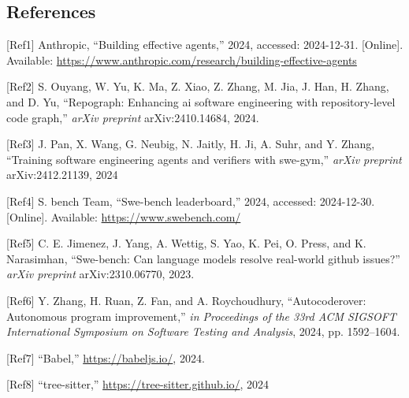 \documentclass[12pt,american]{article}
\begin{document}
\begin{revresponse}

\section*{References}
\begin{flushleft}
\small
    [Ref1] Anthropic, “Building effective agents,” 2024, accessed: 2024-12-31. [Online]. Available: \url{https://www.anthropic.com/research/building-effective-agents}
    
    [Ref2] S. Ouyang, W. Yu, K. Ma, Z. Xiao, Z. Zhang, M. Jia, J. Han, H. Zhang, and D. Yu, “Repograph: Enhancing ai software
    engineering with repository-level code graph,” \textit{arXiv preprint} arXiv:2410.14684, 2024.
    
    [Ref3] J. Pan, X. Wang, G. Neubig, N. Jaitly, H. Ji, A. Suhr, and Y. Zhang, “Training software engineering agents and verifiers
    with swe-gym,” \textit{arXiv preprint} arXiv:2412.21139, 2024
    
  [Ref4] S. bench Team, “Swe-bench leaderboard,” 2024, accessed: 2024-12-30. [Online]. Available: \url{https://www.swebench.com/}

   [Ref5] C. E. Jimenez, J. Yang, A. Wettig, S. Yao, K. Pei, O. Press, and K. Narasimhan, “Swe-bench: Can language models resolve real-world github issues?” \textit{arXiv preprint} arXiv:2310.06770, 2023.

   [Ref6] Y. Zhang, H. Ruan, Z. Fan, and A. Roychoudhury, “Autocoderover: Autonomous program improvement,” \textit{in Proceedings of the 33rd ACM SIGSOFT International Symposium on Software Testing and Analysis}, 2024, pp. 1592–1604.

   [Ref7] “Babel,” \url{https://babeljs.io/}, 2024.

    [Ref8] “tree-sitter,” \url{https://tree-sitter.github.io/}, 2024
\end{flushleft}






\end{revresponse}
\end{document}
